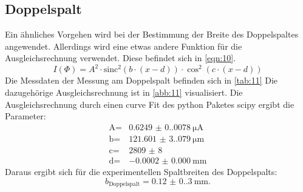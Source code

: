 \subsection{Doppelspalt}
Ein ähnliches Vorgehen wird bei der Bestimmung der Breite des Doppelspaltes
angewendet. Allerdings wird eine etwas andere Funktion für die Ausgleichsrechnung
verwendet. Diese befindet sich in \autoref{eqn:10}.
\begin{equation}
    \label{eqn:10}
    I\left(\Phi\right) = A^2 \cdot \text{sinc}^2\left(b \cdot \left(x - d\right)\right)  \cdot \cos^2{\left(c \cdot \left(x - d\right)\right)}
\end{equation}
\noindent Die Messdaten der Messung am Doppelspalt befinden sich in \autoref{tab:11}
Die dazugehörige Ausgleichsrechnung ist in \autoref{abb:11} visualisiert.
Die Ausgleichsrechnung durch einen curve Fit des python Paketes scipy ergibt
die Parameter:
\begin{align}
    \text{A} = & \qty{0.6249(0.0078)}{\micro\ampere} \\
    \text{b} = & \qty{121.601(3.079)}{\micro\meter}\\
    \text{c} = & \qty{2809(8)}{} \\
    \text{d} = & \qty{-0.0002(0)}{\milli\meter}
\end{align}
\noindent Daraus ergibt sich für die experimentellen Spaltbreiten des Doppelspalts:
\begin{equation}
    b_\text{Doppelspalt} = \qty{0.12(0.30)}{\milli\meter}.
\end{equation}
\noindent
